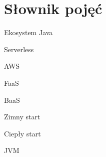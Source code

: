 \chapter*{Słownik pojęć}

Ekosystem Java

Serverless

AWS

FaaS

BaaS

Zimny start

Ciepły start

JVM

